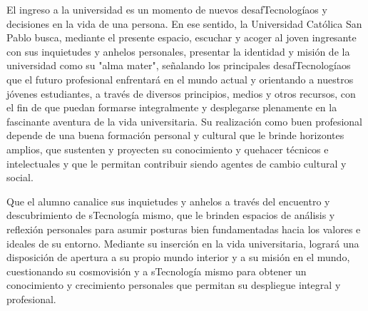 \begin{syllabus}


\begin{justification}
El ingreso a la universidad es un momento de nuevos desafTecnologíaos y decisiones en la vida de una persona. En ese sentido, la Universidad Católica San Pablo busca, mediante el presente espacio, escuchar y acoger al joven ingresante con sus inquietudes y anhelos personales, presentar la identidad y misión de la universidad como su "alma mater", señalando los principales desafTecnologíaos que el futuro profesional enfrentará en el mundo actual  y orientando a nuestros jóvenes estudiantes, a través de diversos principios, medios y otros recursos, con el fin de que puedan formarse integralmente y desplegarse plenamente en la fascinante aventura de la vida universitaria.  Su realización como buen profesional depende de una buena formación personal y cultural que le brinde horizontes amplios, que sustenten y proyecten su conocimiento y quehacer técnicos e intelectuales y que le permitan contribuir siendo agentes de cambio cultural y social.
\end{justification}

\begin{goals}
\item Que el alumno canalice sus inquietudes y anhelos a través del encuentro y descubrimiento de sTecnología mismo, que le brinden espacios de análisis y reflexión personales para asumir posturas bien fundamentadas hacia los valores e ideales de su entorno. Mediante su inserción en la vida universitaria, logrará una disposición de apertura a su propio mundo interior y a su misión en el mundo, cuestionando su cosmovisión y a sTecnología mismo para obtener un conocimiento y crecimiento personales que permitan su despliegue integral y profesional. 
\end{goals}

\begin{outcomes}
\end{outcomes}


\end{syllabus}
